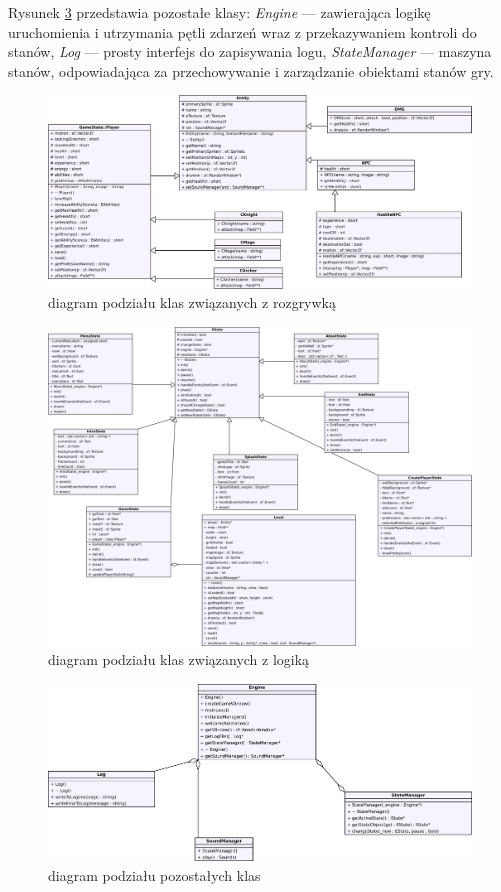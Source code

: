 \documentclass[10pt,a4paper]{article}
\begin{document}
Rysunek \ref{uml-game3} przedstawia pozostałe klasy: \textit{Engine} --- zawierająca logikę uruchomienia i utrzymania pętli zdarzeń wraz z przekazywaniem kontroli do stanów, \textit{Log} --- prosty interfejs do zapisywania logu, \textit{StateManager} --- maszyna stanów, odpowiadająca za przechowywanie i zarządzanie obiektami stanów gry.

\begin{figure}
    \centering
    \includegraphics[width=\textwidth]{uml/class1.pdf}
    \caption{diagram podziału klas związanych z rozgrywką}
    \label{uml-game}
\end{figure}

\begin{figure}
    \centering
    \includegraphics[width=\textwidth]{uml/class2.pdf}
    \caption{diagram podziału klas związanych z logiką}
    \label{uml-game2}
\end{figure}

\begin{figure}
    \centering
    \includegraphics[width=\textwidth]{uml/class3.pdf}
    \caption{diagram podziału pozostałych klas}
    \label{uml-game3}
\end{figure}
\end{document}
